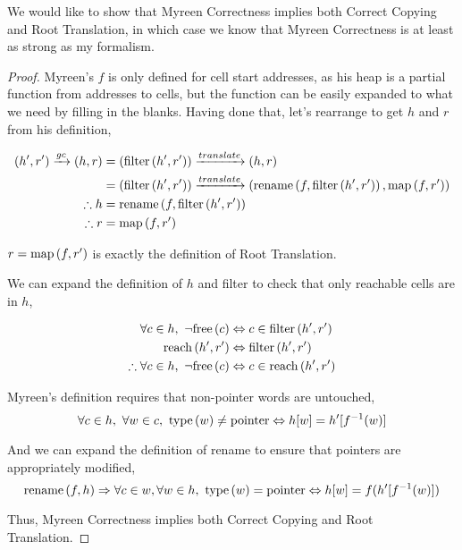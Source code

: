 \begin{theorem}
  We would like to show that Myreen Correctness implies both Correct
  Copying and Root Translation, in which case we know that Myreen
  Correctness is at least as strong as my formalism.
\end{theorem}

\begin{proof}
    Myreen's $f$ is only defined for cell start addresses, as his heap
    is a partial function from addresses to cells, but the function
    can be easily expanded to what we need by filling in the
    blanks. Having done that, let's rearrange to get $h$ and $r$ from
    his definition,

    \begin{align*}
      (h', r') \xrightarrow{gc} (h, r) &= (\mathrm{filter}\left(h', r'\right)) \xrightarrow{translate} (h, r)\\
      &= (\mathrm{filter}\left(h', r'\right)) \xrightarrow{translate} (\mathrm{rename}\left(f, \mathrm{filter}\left(h', r'\right)\right), \mathrm{map}\left(f, r'\right))\\
      \therefore h &= \mathrm{rename}\left(f, \mathrm{filter}\left(h', r'\right)\right)\\
      \therefore r &= \mathrm{map}\left(f, r'\right)
    \end{align*}

    $r = \mathrm{map}\left(f, r'\right)$ is exactly the definition of Root Translation.

    We can expand the definition of $h$ and filter to check that only
    reachable cells are in $h$,

    \begin{align*}
      \forall c \in h,\ \lnot\mathrm{free}\left(c\right) &\Leftrightarrow c \in \mathrm{filter}\left(h', r'\right)\\
      \mathrm{reach}\left(h', r'\right) &\Leftrightarrow \mathrm{filter}\left(h', r'\right)\\
      \therefore \forall c \in h,\ \lnot\mathrm{free}\left(c\right) &\Leftrightarrow c \in \mathrm{reach}\left(h', r'\right)
    \end{align*}

    Myreen's definition requires that non-pointer words are
    untouched, \[\forall c \in h,\ \forall w \in c,\ \type{w}
    \neq \typointer \iff h[w] = h'[f^{-1}(w)]\]

    And we can expand the definition of rename to ensure that pointers
    are appropriately modified, \[\mathrm{rename}\left(f, h\right) \Rightarrow \forall c \in
    w, \forall w \in h,\ \mathrm{type}\left(w\right) = \mathrm{pointer} \Leftrightarrow h[w]
    = f(h'[f^{-1}(w)])\]

    Thus, Myreen Correctness implies both Correct Copying and Root
    Translation.
\end{proof}

